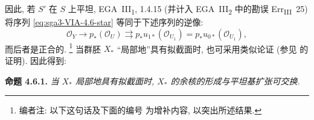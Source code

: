 因此, 若 \(S'\) 在 \(S\) 上平坦,
EGA~III\textsubscript{1}, 1.4.15 (并计入 EGA~III\textsubscript{2}
中的勘误 Err\textsubscript{III}~25) 将序列
\eqref{eq:sga3-VIA-4.6-star} 等同于下述序列的逆像:
\[
  \tag{**}\label{eq:sga3-VIA-4.6-double-star}
  \mathcal O_Y
    \longrightarrow p_*(\mathcal O_U)
    \rightrightarrows
  p_*u_{1*}(\mathcal O_{U_1})
    =
  p_*u_{0*}(\mathcal O_{U_1}),
\]
而后者是正合的.%
\footnote{\label{note:sga3-VIA-47}编者注: 以下这句话及下面的编号
 为增补内容, 以突出所述结果.}
当群胚 \(X_*\) “局部地”具有拟截面时,
也可采用类似论证 (参见 的证明).
因此得到:

\medskip
{}\label{prop:sga3-VIA-4.6.1}%
\noindent\textbf{命题 4.6.1.}
\textit{当 \(X_*\) 局部地具有拟截面时,
\(X_*\) 的余核的形成与平坦基扩张可交换.}
